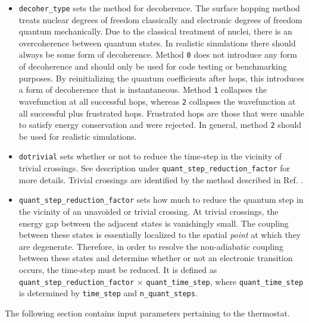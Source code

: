 \documentclass[letterpaper,12pt,titlepage]{article}
\begin{document}
\begin{itemize}
\item \verb+decoher_type+ sets the method for decoherence.  The surface hopping method treats nuclear degrees of freedom classically and electronic degrees of freedom quantum mechanically.  Due to the classical treatment of nuclei, there is an overcoherence between quantum states.  In realistic simulations there should always be some form of decoherence.  Method \verb+0+ does not introduce any form of decoherence and should only be used for code testing or benchmarking purposes.  By reinitializing the quantum coefficients after hops, this introduces a form of decoherence that is instantaneous.  Method \verb+1+ collapses the wavefunction at all successful hops, whereas \verb+2+ collapses the wavefunction at all successful plus frustrated hops.  Frustrated hops are those that were unable to satisfy energy conservation and were rejected.  In general, method \verb+2+ should be used for realistic simulations.
\item \verb+dotrivial+ sets whether or not to reduce the time-step in the vicinity of trivial crossings.  See description under \verb+quant_step_reduction_factor+ for more details.  Trivial crossings are identified by the method described in Ref. \cite{fernandez2012identification}.
\item \verb+quant_step_reduction_factor+ sets how much to reduce the quantum step in the vicinity of an unavoided or trivial crossing.  At trivial crossings, the energy gap between the adjacent states is vanishingly small.  The coupling between these states is essentially localized to the spatial {\it{point}} at which they are degenerate.  Therefore, in order to resolve the non-adiabatic coupling between these states and determine whether or not an electronic transition occurs, the time-step must be reduced.  It is defined as \verb+quant_step_reduction_factor+ $\times$ \verb+quant_time_step+, where \verb+quant_time_step+ is determined by \verb+time_step+ and \verb+n_quant_steps+.
\end{itemize}

The following section contains input parameters pertaining to the thermostat.
\end{document}

